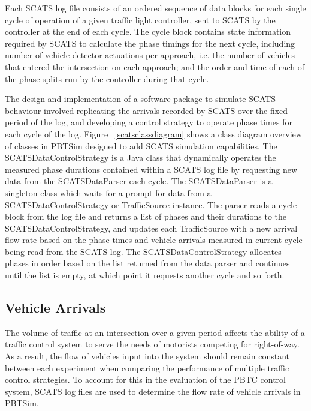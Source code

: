 Each SCATS log file consists of an ordered sequence of data blocks for each single cycle of operation of a given traffic light controller, sent to SCATS by the controller at the end of each cycle. The cycle block contains state information required by SCATS to calculate the phase timings for the next cycle, including number of vehicle detector actuations per approach, i.e. the number of vehicles that entered the intersection on each approach; and the order and time of each of the phase splits run by the controller during that cycle. 

The design and implementation of a software package to simulate SCATS behaviour involved replicating the arrivals recorded by SCATS over the fixed period of the log, and developing a control strategy to operate phase times for each cycle of the log. Figure ~\ref{scatsclassdiagram} shows a class diagram overview of classes in PBTSim designed to add SCATS simulation capabilities. The SCATSDataControlStrategy is a Java class that dynamically operates the measured phase durations contained within a SCATS log file by requesting new data from the SCATSDataParser each cycle. The SCATSDataParser is a singleton class which waits for a prompt for data from a SCATSDataControlStrategy or TrafficSource instance. The parser reads a cycle block from the log file and returns a list of phases and their durations to the SCATSDataControlStrategy, and updates each TrafficSource with a new arrival flow rate based on the phase times and vehicle arrivals measured in current cycle being read from the SCATS log. The SCATSDataControlStrategy allocates phases in order based on the list returned from the data parser and continues until the list is empty, at which point it requests another cycle and so forth.

\subsection{Vehicle Arrivals}

The volume of traffic at an intersection over a given period affects the ability of a traffic control system to serve the needs of motorists competing for right-of-way. As a result, the flow of vehicles input into the system should remain constant between each experiment when comparing the performance of multiple traffic control strategies. To account for this in the evaluation of the PBTC control system, SCATS log files are used to determine the flow rate of vehicle arrivals in PBTSim. 

